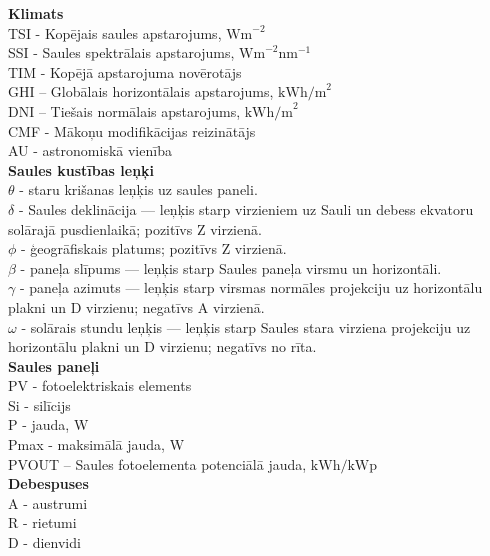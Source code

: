 \noindent 
\textbf{Klimats}\\
TSI - Kopējais saules apstarojums, $\textrm{Wm}^{-2}$\\
SSI - Saules spektrālais apstarojums, $\textrm{Wm}^{-2}\textrm{nm}^{-1}$\\
TIM - Kopējā apstarojuma novērotājs\\
GHI – Globālais horizontālais apstarojums,  $\textrm{kWh/m}^2$\\ %
DNI – Tiešais normālais apstarojums, $\textrm{kWh/m}^2$\\ %
CMF - Mākoņu modifikācijas reizinātājs\\
AU - astronomiskā vienība\\  %
\textbf{Saules kustības leņķi}\\
$\theta$ - staru krišanas leņķis uz saules paneli.\\
$\delta$ - Saules deklinācija --- leņķis starp virzieniem uz Sauli un debess ekvatoru solārajā pusdienlaikā; pozitīvs Z virzienā.\\
 $\phi$  - ģeogrāfiskais platums; pozitīvs Z virzienā.\\
$\beta$  - paneļa slīpums --- leņķis starp Saules paneļa virsmu un horizontāli.\\
$\gamma$ - paneļa azimuts --- leņķis starp virsmas normāles projekciju uz horizontālu  plakni un D virzienu; negatīvs A virzienā.\\
$\omega$ - solārais stundu leņķis --- leņķis starp Saules stara virziena projekciju uz horizontālu plakni un D virzienu; negatīvs no rīta.\\
\textbf{Saules paneļi}\\
PV - fotoelektriskais elements\\ %
Si - silīcijs\\
P - jauda, 	W\\
Pmax - maksimālā jauda, W\\
PVOUT – Saules fotoelementa potenciālā jauda, $\textrm{kWh/kWp}$\\ %
\textbf{Debespuses}\\
A - austrumi\\
R - rietumi\\
D - dienvidi\\